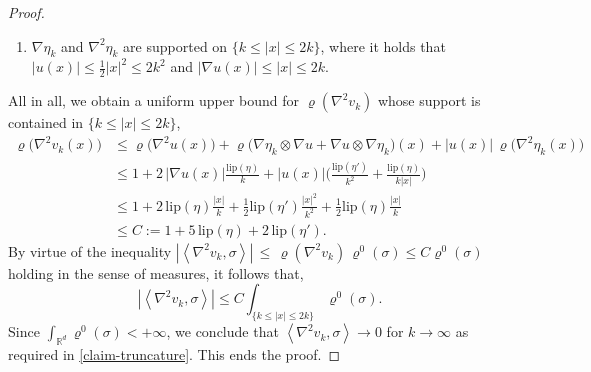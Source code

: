 \documentclass[10pt,a4paper]{amsart}
\newcommand{\Lip}{{\mathrm{lip}}}
\newcommand{\R}{\mathbb{R}}
\newcommand{\abs}[1]{{\left \lvert #1 \right \rvert}}
\newcommand{\pairing}[1]{{\left \langle #1 \right \rangle}}
\begin{document}
\begin{proof}
\begin{enumerate}
\item[-] $\nabla \eta_k$ and $\nabla^2 \eta_k$ are supported on $\{ k\le |x|\le 2k\}$, where it holds that $|u(x)|\le \frac1{2} |x|^2\le 2 k^2$ and $|\nabla u(x)|\le  |x|\le 2 k$.
\end{enumerate}
All in all,  we obtain a uniform upper bound for $\varrho(\nabla^2 v_k)$ whose support is contained  in $\{k\le |x| \le 2k\}$,
\begin{align*} \varrho\big(\nabla^2 v_k(x)\big) &\le  \varrho\big(\nabla^2u(x)\big)  + \varrho\big(\nabla \eta_k \otimes \nabla u +\nabla u\otimes \nabla \eta_k\big)(x)
+ |u(x)|\, \varrho\big(\nabla^2 \eta_k(x)\big) \\
&\le 1 +  2\,|\nabla u(x)|\frac{\Lip(\eta)}{k} + |u(x)| \Big( \frac{\Lip(\eta')}{k^2} + \frac{\Lip(\eta)}{k \abs{x}} \Big)\\
& \le 1 +  2 \,\Lip(\eta) \frac{|x|}{k} + \frac1{2} \Lip(\eta') \frac {|x|^2}{k^2} + \frac1{2} \Lip(\eta) \frac {|x|}{k} \\
&\le C:=1 + 5 \, \Lip(\eta) + 2 \,\Lip(\eta').
\end{align*} 
By virtue of the  inequality  $|\pairing{\nabla^2 v_k,\sigma}|\, \le\,  \varrho(\nabla^2 v_k)\, \varrho^0(\sigma) \le C  \varrho^0(\sigma) $ 
holding in  the sense of measures,
it follows that,
$$  |\pairing{\nabla^2 v_k,\sigma}|  \le  C \int_{\{k\le |x| \le 2k\}}  \varrho^0(\sigma) .
$$
Since $\int_{\R^d} \varrho^0(\sigma)<+\infty$, we conclude that $\pairing{\nabla^2 v_k,\sigma}\to 0$ for $k\to\infty$
as required in \eqref{claim-truncature}.
This ends the proof.
\end{proof}
\end{document}
